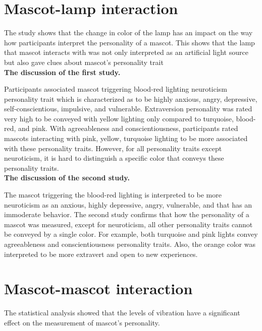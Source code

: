 \section{Mascot-lamp interaction}
\label{sec:mascot-lamp-interaction}
The study shows that the change in color of the lamp has an impact on the way
how participants interpret the personality of a mascot.
This shows that the lamp that mascot interacts with was not only interpreted as an
artificial light source but also gave clues about mascot's personality trait\\

\textbf{The discussion of the first study.}\par
Participants associated mascot triggering blood-red lighting neuroticism personality trait
which is characterized as to be highly anxious, angry, depressive, self-conscientious, impulsive, and vulnerable.
Extraversion personality was rated very high to be conveyed with yellow lighting only compared
to turquoise, blood-red, and pink.
With agreeableness and conscientiousness, participants rated mascots interacting with pink, yellow,
turquoise lighting to be more associated with these personality traits.
However, for all personality traits except neuroticism, it is hard to distinguish
a specific color that conveys these personality traits.\\

\textbf{The discussion of the second study.}\par
The mascot triggering the blood-red lighting is interpreted to be more neuroticism as an anxious, highly depressive,
angry, vulnerable, and that has an immoderate behavior.
The second study confirms that how the personality of a mascot was measured, except
for neuroticism, all other personality traits cannot be conveyed by a single color.
For example, both turquoise and pink lights convey agreeableness and
conscientiousness personality traits.
Also, the orange color was interpreted to be more extravert and open to new experiences.\\


\section{Mascot-mascot interaction}
\label{sec:mascot-mascot-interaction}
The statistical analysis showed that the levels of vibration have a significant effect on the
measurement of mascot's personality.\\

